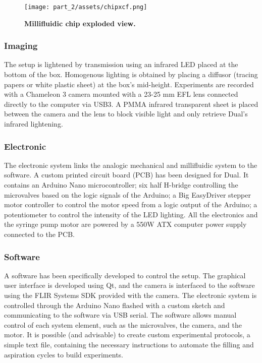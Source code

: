     \begin{figure}[h]
      \centering
      \texttt{[image: part\_2/assets/chipxcf.png]}
      \caption{\textbf{Millifluidic chip exploded view.}}
      \label{dual_chip_visu}
    \end{figure}

  \subsubsection{Imaging}
  The setup is lightened by transmission using an infrared LED placed at the bottom of the box. Homogenous lighting is obtained by placing a diffusor (tracing papers or white plastic sheet) at the box's mid-height. Experiments are recorded with a Chameleon 3 camera mounted with a 23-25 mm EFL lens connected directly to the computer via USB3. A PMMA infrared transparent sheet is placed between the camera and the lens to block visible light and only retrieve Dual's infrared lightening.

  \subsubsection{Electronic}
  The electronic system links the analogic mechanical and millifluidic system to the software. A custom printed circuit board (PCB) has been designed for Dual. It contains an Arduino Nano microcontroller; six half H-bridge controlling the microvalves based on the logic signals of the Arduino; a Big EasyDriver stepper motor controller to control the motor speed from a logic output of the Arduino; a potentiometer to control the intensity of the LED lighting. All the electronics and the syringe pump motor are powered by a 550W ATX computer power supply connected to the PCB.

  \subsubsection{Software}
  A software has been specifically developed to control the setup. The graphical user interface is developed using Qt, and the camera is interfaced to the software using the FLIR Systems SDK provided with the camera. The electronic system is controlled through the Arduino Nano flashed with a custom sketch and communicating to the software via USB serial. The software allows manual control of each system element, such as the microvalves, the camera, and the motor. It is possible (and advisable) to create custom experimental protocols, a simple text file, containing the necessary instructions to automate the filling and aspiration cycles to build experiments.

